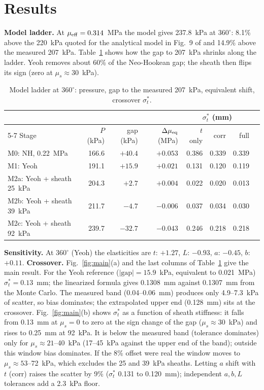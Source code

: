 \documentclass[12pt,letterpaper]{article}
\begin{document}
\section{Results}
\textbf{Model ladder.} At $\mu_{\rm eff}=0.314$~MPa the model gives 237.8~kPa at $360^\circ$: 8.1\% above the 220~kPa quoted for the analytical model in Fig.~9 of \cite{poly2015} and 14.9\% above the measured 207~kPa. Table~\ref{tab:ladder} shows how the gap to 207~kPa shrinks along the ladder. Yeoh removes about 60\% of the Neo-Hookean gap; the sheath then flips its sign (zero at $\mu_s\approx30$~kPa).
\begin{table}[t]
\centering\small
\caption{Model ladder at $360^\circ$: pressure, gap to the measured 207~kPa, equivalent shift, crossover $\sigma_t^*$.}
\label{tab:ladder}
\begin{tabular}{lrrrrrrr}
\toprule
 & & & & \multicolumn{3}{c}{$\sigma_t^*$ (mm)}\\
\cmidrule(lr){5-7}
Stage & $P$ (kPa) & gap (kPa) & $\Delta\mu_{\rm eq}$ (MPa) & $t$ only & corr & full\\
\midrule
M0: NH, 0.22~MPa & 166.6 & $+40.4$ & $+0.053$ & 0.386 & 0.339 & 0.339\\
M1: Yeoh & 191.1 & $+15.9$ & $+0.021$ & 0.131 & 0.120 & 0.119\\
M2a: Yeoh + sheath 25~kPa & 204.3 & $+2.7$ & $+0.004$ & 0.022 & 0.020 & 0.013\\
M2b: Yeoh + sheath 39~kPa & 211.7 & $-4.7$ & $-0.006$ & 0.037 & 0.034 & 0.030\\
M2c: Yeoh + sheath 92~kPa & 239.7 & $-32.7$ & $-0.043$ & 0.246 & 0.218 & 0.218\\
\bottomrule
\end{tabular}
\end{table}

\textbf{Sensitivity.} At $360^\circ$ (Yeoh) the elasticities are $t$: $+1.27$, $L$: $-0.93$, $a$: $-0.45$, $b$: $+0.11$. \textbf{Crossover.} Fig.~\ref{fig:main}(a) and the last columns of Table~\ref{tab:ladder} give the main result. For the Yeoh reference ($|\text{gap}|=15.9$~kPa, equivalent to 0.021~MPa) $\sigma_t^*=0.13$~mm; the linearized formula gives 0.1308~mm against 0.1307~mm from the Monte Carlo. The measured band (0.04--0.06~mm) produces only 4.9--7.3~kPa of scatter, so bias dominates; the extrapolated upper end (0.128~mm) sits at the crossover. Fig.~\ref{fig:main}(b) shows $\sigma_t^*$ as a function of sheath stiffness: it falls from 0.13~mm at $\mu_s=0$ to zero at the sign change of the gap ($\mu_s\approx30$~kPa) and rises to 0.25~mm at 92~kPa. It is below the measured band (tolerance dominates) only for $\mu_s\approx21$--40~kPa (17--45~kPa against the upper end of the band); outside this window bias dominates. If the 8\% offset were real the window moves to $\mu_s\approx53$--72~kPa, which excludes the 25 and 39~kPa sheaths. Letting $a$ shift with $t$ (corr) raises the scatter by 9\% ($\sigma_t^*$ 0.131 to 0.120~mm); independent $a,b,L$ tolerances add a 2.3~kPa floor.
\end{document}
